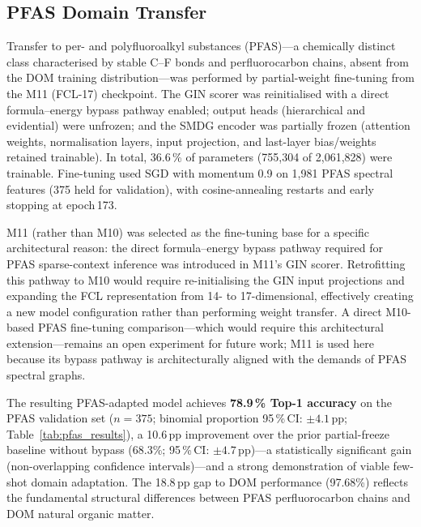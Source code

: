 \documentclass[journal=jcisd8]{achemso}
\begin{document}

\FloatBarrier
\subsection{PFAS Domain Transfer}
\label{sec:pfas}

Transfer to per- and polyfluoroalkyl substances (PFAS)---a chemically distinct class
characterised by stable C--F bonds and perfluorocarbon chains, absent from the DOM
training distribution---was performed by partial-weight fine-tuning from the M11
(FCL-17) checkpoint.  The GIN scorer was reinitialised with a direct formula--energy
bypass pathway enabled; output heads (hierarchical and evidential) were unfrozen; and
the SMDG encoder was partially frozen (attention weights, normalisation layers, input
projection, and last-layer bias/weights retained trainable).  In total,
36.6\,\% of parameters (755,304 of 2,061,828) were trainable.
Fine-tuning used SGD with momentum 0.9 on 1,981 PFAS spectral features
(375 held for validation), with cosine-annealing restarts and early stopping
at epoch\,173.

M11 (rather than M10) was selected as the fine-tuning base for a specific
architectural reason: the direct formula--energy bypass pathway required for PFAS
sparse-context inference was introduced in M11's GIN scorer.  Retrofitting this
pathway to M10 would require re-initialising the GIN input projections and expanding
the FCL representation from 14- to 17-dimensional, effectively creating a new model
configuration rather than performing weight transfer.  A direct M10-based PFAS
fine-tuning comparison---which would require this architectural extension---remains
an open experiment for future work; M11 is used here because its bypass pathway is
architecturally aligned with the demands of PFAS spectral graphs.

The resulting PFAS-adapted model achieves \textbf{78.9\,\% Top-1 accuracy}
on the PFAS validation set ($n=375$; binomial proportion 95\,\%\,CI: $\pm4.1$\,pp;
Table~\ref{tab:pfas_results}), a 10.6\,pp improvement over the prior partial-freeze
baseline without bypass (68.3\%; 95\,\%\,CI: $\pm4.7$\,pp)---a statistically
significant gain (non-overlapping confidence intervals)---and a strong
demonstration of viable few-shot domain adaptation.
The 18.8\,pp gap to DOM performance (97.68\%) reflects the fundamental structural
differences between PFAS perfluorocarbon chains and DOM natural organic matter.
\end{document}
